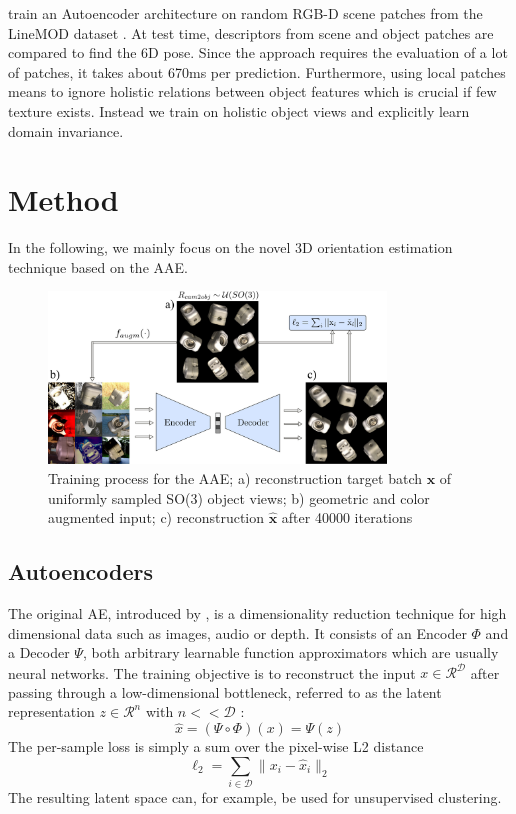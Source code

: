 \cite{kehl2016deep} train an Autoencoder architecture on random RGB-D scene patches from the LineMOD dataset \cite{hinterstoisser2011multimodal}. At test time, descriptors from scene and object patches are compared to find the 6D pose.
Since the approach requires the evaluation of a lot of patches, it takes about 670ms per prediction. Furthermore, using local patches means to ignore holistic relations between object features which is crucial if few texture exists. Instead we train on holistic object views and explicitly learn domain invariance.


\section{Method}

In the following, we mainly focus on the novel 3D orientation estimation technique based on the AAE.
\begin{figure}[t]%
	\centering
	\captionsetup{width=0.9\textwidth}
	\includegraphics[width=0.8\textwidth]{training_process.pdf}
	\caption{Training process for the \gls{AAE}; a) reconstruction target batch $\pmb x$ of uniformly sampled SO(3) object views; b) geometric and color augmented input; c) reconstruction $\pmb{\hat{x}}$ after 40000 iterations}
	\label{fig:training_process}
\end{figure}
\subsection{Autoencoders}

The original \gls{AE}, introduced by \cite{rumelhart1985learning}, is a dimensionality reduction technique for high dimensional data such as images, audio or depth. It consists of an Encoder $\Phi$ and a Decoder $\Psi$, both arbitrary learnable function approximators which are usually neural networks. The training objective is to reconstruct the input $x \in \mathcal{R}^{\mathcal{D}}$ after passing through a low-dimensional bottleneck, referred to as the latent representation $z \in \mathcal{R}^{n}$ with $n << \mathcal{D}$ :
\begin{equation}
\label{eq:yhat}
\hat{x} = (\Psi\circ\Phi)(x) = \Psi(z)
\end{equation}
The per-sample loss is simply a sum over the pixel-wise L2 distance
\begin{equation}
\label{eq:ae_loss}
\ell_{2} = \sum_{i \in \mathcal{D}} \parallel x_{i}-\hat{x}_{i}\parallel_2
\end{equation}
The resulting latent space can, for example, be used for unsupervised clustering.

